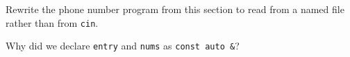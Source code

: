 %
%
\begin{question}
Rewrite the phone number program from this section to read
from a named file rather than from \verb|cin|.
\end{question}

\begin{question}
Why did we declare \verb|entry| and \verb|nums| as \verb|const auto &|?
\end{question}
